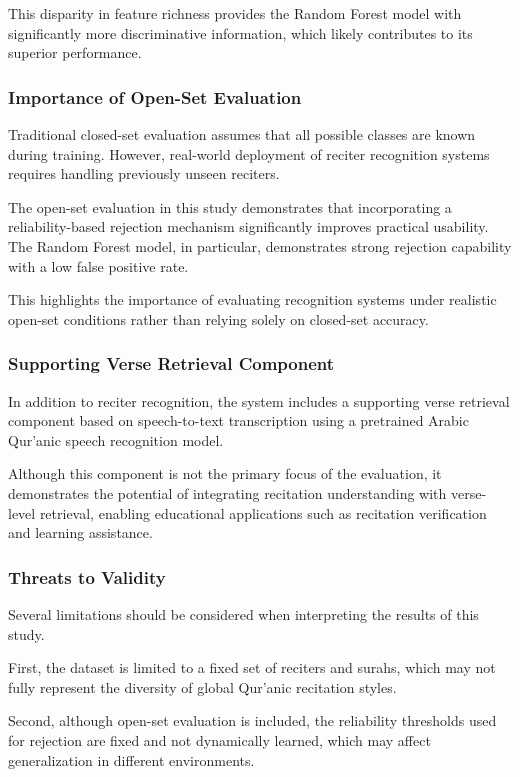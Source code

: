 \documentclass[conference]{IEEEtran}
\begin{document}
This disparity in feature richness provides the Random Forest model with significantly more discriminative information, which likely contributes to its superior performance.

\subsubsection{Importance of Open-Set Evaluation}

Traditional closed-set evaluation assumes that all possible classes are known during training. However, real-world deployment of reciter recognition systems requires handling previously unseen reciters.

The open-set evaluation in this study demonstrates that incorporating a reliability-based rejection mechanism significantly improves practical usability. The Random Forest model, in particular, demonstrates strong rejection capability with a low false positive rate.

This highlights the importance of evaluating recognition systems under realistic open-set conditions rather than relying solely on closed-set accuracy.

\subsubsection{Supporting Verse Retrieval Component}

In addition to reciter recognition, the system includes a supporting verse retrieval component based on speech-to-text transcription using a pretrained Arabic Qur'anic speech recognition model.

Although this component is not the primary focus of the evaluation, it demonstrates the potential of integrating recitation understanding with verse-level retrieval, enabling educational applications such as recitation verification and learning assistance.

\subsubsection{Threats to Validity}

Several limitations should be considered when interpreting the results of this study.

First, the dataset is limited to a fixed set of reciters and surahs, which may not fully represent the diversity of global Qur'anic recitation styles.

Second, although open-set evaluation is included, the reliability thresholds used for rejection are fixed and not dynamically learned, which may affect generalization in different environments.
\end{document}
